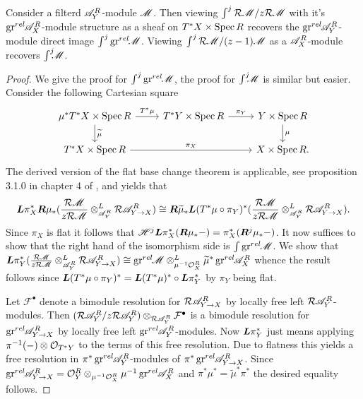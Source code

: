 \begin{lemma}\label{lem: ReesAndOtherDirectImagesAgree}
  Consider a filterd $\mathscr{A}_Y^R$-module $\mathscr{M}$. Then viewing $\int^j \mathcal{R}\mathscr{M} / z\mathcal{R}\mathscr{M}$ with it's $\operatorname{gr}^{rel}\mkern-5mu\mathscr{A}_X^R$-module structure as a sheaf on $T^*X\times \operatorname{Spec} R$ recovers the $\operatorname{gr}^{rel}\mkern-5mu\mathscr{A}_Y^R$-module direct image $\int^j \operatorname{gr}^{rel}\mkern-5mu\mathscr{M}$. Viewing  $\int^j \mathcal{R}\mathscr{M} / (z-1)\mathscr{M}$ as a $\mathscr{A}_X^R$-module recovers $\int^j \mkern -8mu \mathscr{M}$.
\end{lemma}
\begin{proof}
  We give the proof for $\int^j \operatorname{gr}^{rel}\mkern-5mu \mathscr{M}$, the proof for $\int^j \mkern -8mu \mathscr{M}$ is similar but easier.
  Consider the following Cartesian square
  $$
      \begin{tikzcd}
        \mu^*T^* X \times \Spec R \arrow{r}{T^*\mu} \arrow{d}{{\widetilde{\mu}}} &T^*Y\times \Spec R \arrow{r}{\pi_Y} & Y\times \Spec R\arrow{d}{\mu} \\
        T^*X\arrow{rr}{\pi_X}  \times \Spec R && X\times \Spec R.
      \end{tikzcd}
  $$
  The derived version of the flat base change theorem is applicable, see proposition 3.1.0 in chapter 4 of \cite{berthelot2006theorie}, and yields that
  $$\boldsymbol{L}\pi_X^*\boldsymbol{R}\mu_*(\frac{\mathcal{R}\mathscr{M}}{z\mathcal{R} \mathscr{M}}\otimes^L_{\mathscr{A}_Y^R}\mathcal{R} \mathscr{A}_{Y\to X}^R)\cong  \boldsymbol{R}\widetilde{\mu}_*\boldsymbol{L}(T^*\mu\circ\pi_Y)^*(\frac{\mathcal{R}\mathscr{M}}{z\mathcal{R} \mathscr{M}}\otimes^L_{\mathscr{A}_Y^R}\mathcal{R} \mathscr{A}_{Y\to X}^R).$$
  Since $\pi_X$ is flat it follows that $\mathscr{H}^j \boldsymbol{L}\pi_X^*(\boldsymbol{R}\mu_* {-}) = \pi_X^*(\boldsymbol{R}^j\mu_*{-})$. It now suffices to show that the right hand of the isomorphism side is $\int \operatorname{gr}^{rel}\mkern-5mu\mathscr{M}$.
  We show that $\boldsymbol{L}\pi_Y^*(\frac{\mathcal{R}\mathscr{M}}{z\mathcal{R} \mathscr{M}}\otimes^L_{\mathscr{A}_Y^R}\mathcal{R} \mathscr{A}_{Y\to X}^R)\cong \operatorname{gr}^{rel}\mkern-5mu\mathscr{M} \otimes^L_{\mu^{-1}\mathcal{O}_X^R}\widetilde{\mu}^*\operatorname{gr}^{rel}\mkern-5mu\mathscr{A}_{X}^R$
  whence the result follows since $\boldsymbol{L}(T^*\mu \circ \pi_Y)^* = \boldsymbol{L} (T^*\mu)^* \circ \boldsymbol{L} \pi_Y^*$ by $\pi_Y$ being flat.

  Let $\mathcal{F}^\bullet$ denote a bimodule resolution for $\mathcal{R} \mathscr{A}_{Y\to X}^R$ by locally free left $\mathcal{R}\mathscr{A}_Y^R$-modules.
  Then $(\mathcal{R} \mathscr{A}_Y^R / z\mathcal{R} \mathscr{A}_Y^R)\otimes_{\mathcal{R} \mathscr{A}_Y^R}\mathcal{F}^\bullet$ is a bimodule resolution for $\operatorname{gr}^{rel}\mkern-5mu \mathscr{A}_{Y\to X}^R$ by locally free left $\operatorname{gr}^{rel}\mkern-5mu\mathscr{A}_Y^R$-modules.
  Now $\boldsymbol{L}\pi_Y^*$ just means applying $\pi^{-1}({-})\otimes \mathcal{O}_{T^*Y}$ to the terms of this free resolution.
  Due to flatness this yields a free resolution in $\pi^{*}\operatorname{gr}^{rel}\mkern-5mu\mathscr{A}_Y^R$-modules of $\pi^* \operatorname{gr}^{rel}\mkern-5mu\mathscr{A}_{Y\to X}^R$.
  Since $\operatorname{gr}^{rel}\mkern-5mu \mathscr{A}_{Y\to X}^R = \mathcal{O}_Y^R \otimes_{\mu^{-1}\mathcal{O}_X^R} \mu^{-1}\operatorname{gr}^{rel}\mkern-5mu\mathscr{A}_X^R$ and $\pi^*\mu^* = \widetilde{\mu}^*\pi^*$ the desired equality follows.
\end{proof}
